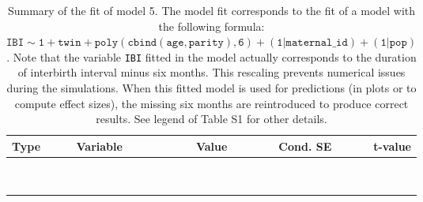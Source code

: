 \begin{table}

\caption{\label{tab:tab5}Summary of the fit of model 5. The model fit corresponds to the fit of a model with the following formula: {\small$\mathtt{IBI \sim 1 + twin + poly(cbind(age, parity), 6) + (1 | maternal\_id) + (1 | pop)}$}. Note that the variable \texttt{IBI} fitted in the model actually corresponds to the duration of interbirth interval minus six months. This rescaling prevents numerical issues during the simulations. When this fitted model is used for predictions (in plots or to compute effect sizes), the missing six months are reintroduced to produce correct results. See legend of Table S1 for other details.}
\centering
\fontsize{8}{10}\selectfont
\begin{tabular}[t]{>{\raggedright\arraybackslash}p{3cm}>{\raggedright\arraybackslash}p{5cm}rrr}
\toprule
Type & Variable & Value & Cond. SE & t-value\\
\midrule
\cellcolor{gray!6}{fixed effects} & \cellcolor{gray!6}{$\beta_1$} & \cellcolor{gray!6}{3.44} & \cellcolor{gray!6}{0.0579} & \cellcolor{gray!6}{59.5}\\
\cellcolor{gray!6}{} & \cellcolor{gray!6}{$\beta_{\mathtt{twin}}$} & \cellcolor{gray!6}{-0.0328} & \cellcolor{gray!6}{0.015} & \cellcolor{gray!6}{-2.18}\\
\cellcolor{gray!6}{} & \cellcolor{gray!6}{$\beta_{\mathtt{age}}$} & \cellcolor{gray!6}{-63.6} & \cellcolor{gray!6}{21.9} & \cellcolor{gray!6}{-2.9}\\
\cellcolor{gray!6}{} & \cellcolor{gray!6}{$\beta_{\mathtt{age}^2}$} & \cellcolor{gray!6}{39.7} & \cellcolor{gray!6}{19.6} & \cellcolor{gray!6}{2.02}\\
\cellcolor{gray!6}{} & \cellcolor{gray!6}{$\beta_{\mathtt{age}^3}$} & \cellcolor{gray!6}{-31.3} & \cellcolor{gray!6}{13} & \cellcolor{gray!6}{-2.41}\\
\cellcolor{gray!6}{} & \cellcolor{gray!6}{$\beta_{\mathtt{age}^4}$} & \cellcolor{gray!6}{15} & \cellcolor{gray!6}{6.31} & \cellcolor{gray!6}{2.38}\\
\cellcolor{gray!6}{} & \cellcolor{gray!6}{$\beta_{\mathtt{age}^5}$} & \cellcolor{gray!6}{-5} & \cellcolor{gray!6}{2.42} & \cellcolor{gray!6}{-2.07}\\
\cellcolor{gray!6}{} & \cellcolor{gray!6}{$\beta_{\mathtt{age}^6}$} & \cellcolor{gray!6}{4.01} & \cellcolor{gray!6}{1.01} & \cellcolor{gray!6}{3.95}\\
\cellcolor{gray!6}{} & \cellcolor{gray!6}{$\beta_{\mathtt{parity}}$} & \cellcolor{gray!6}{121} & \cellcolor{gray!6}{40.7} & \cellcolor{gray!6}{2.96}\\

\end{tabular}
\end{table}
